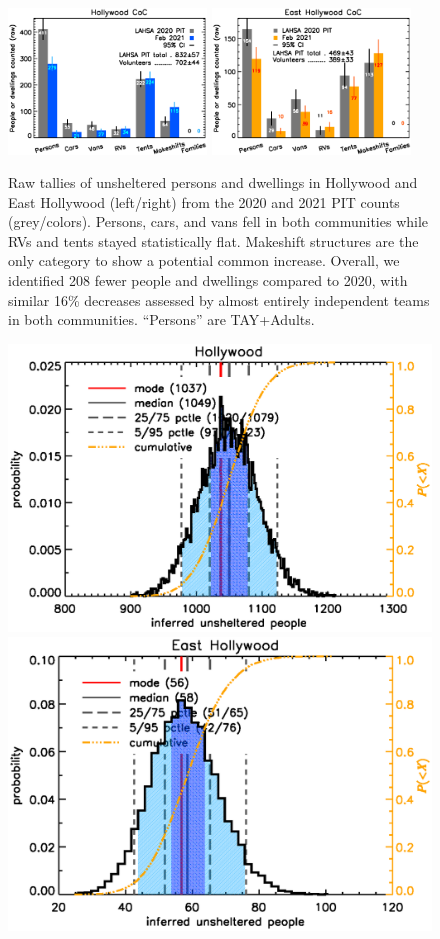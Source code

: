 \documentclass[11pt,twocolumn]{article}
\begin{document}
\begin{figure}[t]
	\centering
	\includegraphics[width = 0.47\textwidth, trim = 1cm 0cm 0cm 0cm]{Hwood2021Bars}
	\includegraphics[width = 0.47\textwidth, trim = 0cm 0cm 1cm 0cm]{Eho2021Bars}
	\caption{Raw tallies of unsheltered persons and dwellings in Hollywood and East Hollywood
			(left/right) from the 2020 and 2021 PIT counts (grey/colors). Persons, cars, 
			and vans fell in both communities while RVs and tents stayed statistically flat. 
			Makeshift structures are the only category to show a potential common increase. 
			Overall, we identified 208 fewer people and dwellings compared to 2020,
			with similar 16\% decreases assessed by almost entirely independent teams
			in both communities. ``Persons'' are TAY+Adults.}
	\label{fig:rawCounts}
\end{figure}

\begin{figure}[t]
	\centering
	\includegraphics[width =0.47\linewidth]{hWood/HollywoodDist}
	\includegraphics[width =0.47\linewidth]{eHo/EastHollywoodDist}
	\caption{}
\end{figure}
\end{document}

